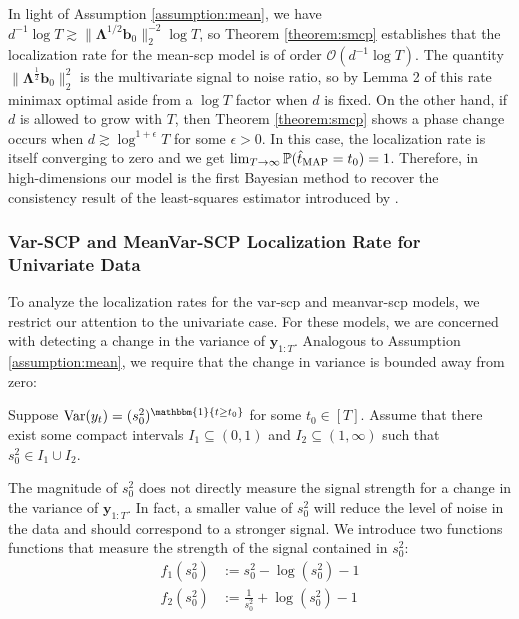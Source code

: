 In light of Assumption \ref{assumption:mean}, we have $d^{-1}\log T \gtrsim \lVert\boldsymbol{\Lambda}^{1/2}\mathbf{b}_0\rVert_2^{-2}\log T$, so Theorem \ref{theorem:smcp} establishes that the localization rate for the mean-scp model is of order $\mathcal{O}(d^{-1} \log T)$. The quantity $\lVert \boldsymbol{\Lambda}^{\frac{1}{2}} \mathbf{b}_0\rVert_2^2$ is the multivariate signal to noise ratio, so by Lemma 2 of \cite{Wang2020_localization} this rate minimax optimal aside from a $\log T$ factor when $d$ is fixed. On the other hand, if $d$ is allowed to grow with $T$, then Theorem \ref{theorem:smcp} shows a phase change occurs when $d\gtrsim \log^{1+\epsilon}T$ for some $\epsilon > 0$. In this case, the localization rate is itself converging to zero and we get $\lim_{T\to\infty}\Pr(\hat{t}_{\normalfont \text{MAP}} = t_0) = 1$. Therefore, in high-dimensions our model is the first Bayesian method to recover the consistency result of the least-squares estimator introduced by \cite{Bai10}. 

%

\subsubsection{Var-SCP and MeanVar-SCP Localization Rate for Univariate Data}

To analyze the localization rates for the var-scp and meanvar-scp models, we restrict our attention to the univariate case. For these models, we are concerned with detecting a change in the variance of $\mathbf{y}_{1:T}$. Analogous to Assumption \ref{assumption:mean}, we require that the change in variance is bounded away from zero:
\begin{assumption}\label{assumption:scale}
   Suppose $\normalfont{\Var}(y_t) = (s_0^2)^{\mathbbm{1}\{t\geq t_0\}}$ for some $t_0 \in [T]$. Assume that there exist some compact intervals $I_1 \subseteq(0, 1)$ and $I_2 \subseteq(1, \infty)$ such that $s_0^2 \in I_1 \cup I_2$. 
\end{assumption}
\vspace{-5pt}
The magnitude of $s_0^2$ does not directly measure the signal strength for a change in the variance of $\mathbf{y}_{1:T}$. In fact, a smaller value of $s_0^2$ will reduce the level of noise in the data and should correspond to a stronger signal. We introduce two functions functions that measure the strength of the signal contained in $s_0^2$:
\begin{align}
    f_1(s_0^2) &:= s_0^2 - \log (s_0^2) - 1 \label{eq:f1-signal-fn} \\
    f_2(s_0^2) &:= \frac{1}{s_0^2} + \log (s_0^2) - 1\label{eq:f2-signal-fn}
\end{align}

